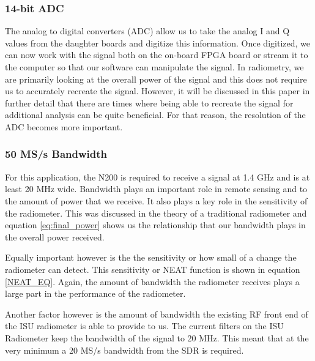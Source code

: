 \subsubsection{14-bit ADC}
The analog to digital converters (ADC) allow us to take the analog I and Q values from the daughter boards and digitize this information.  Once digitized, we can now work with the signal both on the on-board FPGA board or stream it to the computer so that our software can manipulate the signal.  In radiometry, we are primarily looking at the overall power of the signal and this does not require us to accurately recreate the signal.  However, it will be discussed in this paper in further detail that there are times where being able to recreate the signal for additional analysis can be quite beneficial.  For that reason, the resolution of the ADC becomes more important.

\subsubsection{50 MS/s Bandwidth}
For this application, the N200 is required to receive a signal at 1.4 GHz and is at least 20 MHz wide.  Bandwidth plays an important role in remote sensing and to the amount of power that we receive.  It also plays a key role in the sensitivity of the radiometer.  This was discussed in the theory of a traditional radiometer and equation \ref{eq:final_power} shows us the relationship that our bandwidth plays in the overall power received.    

Equally important however is the the sensitivity or how small of a change the radiometer can detect.  This sensitivity or NEAT function is shown in equation \ref{NEAT_EQ}.  Again, the amount of bandwidth the radiometer receives plays a large part in the performance of the radiometer.  

Another factor however is the amount of bandwidth the existing RF front end of the ISU radiometer is able to provide to us.  The current filters on the ISU Radiometer keep the bandwidth of the signal to 20 MHz.  This meant that at the very minimum a 20 MS/s bandwidth from the SDR is required.  

